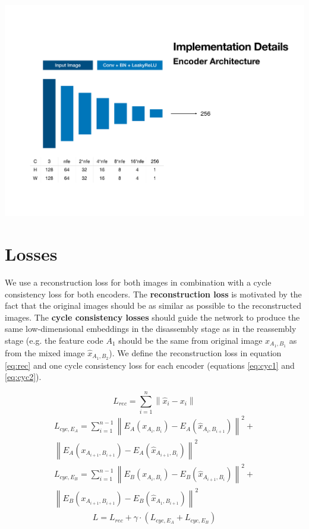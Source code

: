 \documentclass{article}
\newenvironment{Figure}
  {\par\medskip\noindent\minipage{\linewidth}}
  {\endminipage\par\medskip}
\begin{document}
\begin{multicols}{2}
\begin{Figure}
	\centering 
	\includegraphics[width=0.75\linewidth]{figures/encoders.pdf}
	\label{fig:encoders}
\end{Figure}

\section{Losses}
We use a reconstruction loss for both images in combination with a cycle consistency loss for both encoders. The \textbf{reconstruction loss} is motivated by the fact that the original images should be as similar as possible to the reconstructed images. The \textbf{cycle consistency losses} should guide the network to produce the same low-dimensional embeddings in the disassembly stage as in the reassembly stage (e.g. the feature code $A_1$ should be the same from original image $x_{A_1,B_1}$ as from the mixed image $\hat{x}_{A_1,B_2}$). We define the reconstruction loss in equation \ref{eq:rec} and one cycle consistency loss for each encoder (equations  \ref{eq:cyc1} and \ref{eq:cyc2}).

\begin{equation}
	L_{rec} = \sum_{i=1}^{n} \left\| \hat{x}_i - x_i \right\| 
	\label{eq:rec}
\end{equation}
\begin{multline}
	L_{cyc,E_A} = \sum_{i=1}^{n-1} \left\| E_A(x_{A_i,B_i})- E_A(\hat{x}_{A_i,B_{i+1}})\right\| ^2+ 
	\\
	\left\| E_A(x_{A_{i+1},B_{i+1}}) - E_A(\hat{x}_{A_{i+1},B_i})\right\|^2
	\label{eq:cyc1}
\end{multline}
\begin{multline}
	L_{cyc,E_B} = \sum_{i=1}^{n-1} \left\| E_B(x_{A_i,B_i}) - E_B(\hat{x}_{A_{i+1},B_i})\right\| ^2+ 
	\\
	\left\| E_B(x_{A_{i+1},B_{i+1}}) - E_B(\hat{x}_{A_1,B_{i+1}})\right\|^2
	\label{eq:cyc2}
\end{multline}
\begin{multline}
	L = L_{rec} + \gamma \cdot (L_{cyc,E_A} + L_{cyc,E_B})
	\label{eq:all}
\end{multline}


\end{multicols}
\end{document}
